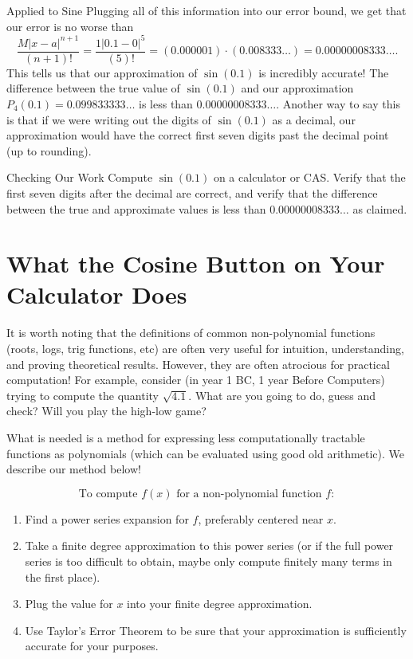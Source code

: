 \begin{example}{ Applied to Sine}
Plugging all of this information into our error bound, we get that our error is no worse than $$\frac{M|x-a|^{n+1}}{(n+1)!}=\frac{1|0.1-0|^{5}}{(5)!}= (0.000001)\cdot(0.008333\ldots)=0.00000008333\ldots.  $$
This tells us that our approximation of $\sin(0.1)$ is incredibly accurate!  The difference between the true value of $\sin(0.1)$ and our approximation $P_4(0.1)=0.099833333\ldots$ is less than $0.00000008333\ldots$.  Another way to say this is that if we were writing out the digits of $\sin(0.1)$ as a decimal, our approximation would have the correct first seven digits past the decimal point (up to rounding).   
\end{example}

\begin{exercise}{Checking Our Work \Coffeecup}
Compute $\sin(0.1)$ on a calculator or CAS.  Verify that the first seven digits after the decimal are correct, and verify that the difference between the true and approximate values is less than $0.00000008333\ldots$ as claimed. \vspace*{1in}
\end{exercise}

\section{What the Cosine Button on Your Calculator Does}

It is worth noting that the definitions of common non-polynomial functions (roots, logs, trig functions, etc) are often very useful for intuition, understanding, and proving theoretical results.  However, they are often atrocious for practical computation!  For example, consider (in year 1 BC, 1 year Before Computers) trying to compute the quantity $\sqrt{4.1}$.  What are you going to do, guess and check?  Will you play the high-low game? 

What is needed is a method for expressing less computationally tractable functions as polynomials (which can be evaluated using good old arithmetic).  We describe our method below!

$$ \text{To compute } f(x) \text{ for a non-polynomial function } f:$$

\begin{enumerate}

\item Find a power series expansion for $f$, preferably centered near $x$.

\item Take a finite degree approximation to this power series (or if the full power series is too difficult to obtain, maybe only compute finitely many terms in the first place).

\item Plug the value for $x$ into your finite degree approximation.

\item Use Taylor's Error Theorem to be sure that your approximation is sufficiently accurate for your purposes.

\end{enumerate}
 
